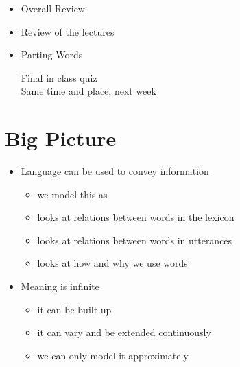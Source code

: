 \documentclass[headrule,footrule]{foils}
\begin{document}
\maketitle


%



\begin{itemize}
\item Overall Review
\item Review of the lectures
\item Parting Words
  \begin{center}
    Final in class quiz \\
    Same time and place, next week
  \end{center}
\end{itemize}


\section{Big Picture}

\begin{itemize}
\item Language can be used to convey information
  \begin{itemize}
  \item we model this as 
  \item {} looks at relations between words in
    the lexicon
  \item {} looks at relations between words in
    utterances
  \item {} looks at how and why we use words
  \end{itemize}
\item Meaning is infinite
  \begin{itemize}
  \item it can be built up 
  \item it can vary and be extended continuously
  \item we can only model it approximately
  \end{itemize}
\end{itemize}
\end{document}
